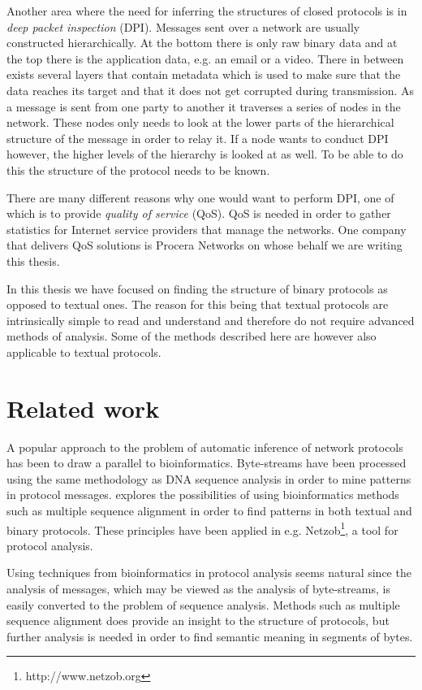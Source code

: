 \documentclass[a4paper]{report}
\begin{document}
Another area where the need for inferring the structures of closed protocols is
in \emph{deep packet inspection} (DPI). Messages sent over a network are
usually constructed hierarchically. At the bottom there is only raw binary data
and at the top there is the application data, e.g. an email or a video. There
in between exists several layers that contain metadata which is used to make
sure that the data reaches its target and that it does not get corrupted during
transmission. As a message is sent from one party to another it traverses a
series of nodes in the network. These nodes only needs to look at the lower
parts of the hierarchical structure of the message in order to relay it. If a
node wants to conduct DPI however, the higher levels of the hierarchy is looked
at as well. To be able to do this the structure of the protocol needs to be
known.

There are many different reasons why one would want to perform DPI, one of
which is to provide \emph{quality of service} (QoS). QoS is needed in order to
gather statistics for Internet service providers that manage the networks. One
company that delivers QoS solutions is Procera Networks on whose behalf we are
writing this thesis.

In this thesis we have focused on finding the structure of binary protocols as
opposed to textual ones. The reason for this being that textual protocols are
intrinsically simple to read and understand and therefore do not require
advanced methods of analysis. Some of the methods described here are however
also applicable to textual protocols.

\section{Related work}
A popular approach to the problem of automatic inference of network protocols
has been to draw a parallel to bioinformatics. Byte-streams have been
processed using the same methodology as DNA sequence analysis in order
to mine patterns in protocol messages. \citep{beddoe05} explores the
possibilities of using bioinformatics methods such as multiple sequence
alignment in order to find patterns in both textual and binary protocols. These
principles have been applied in e.g. Netzob\footnote{http://www.netzob.org}, a
tool for protocol analysis.

Using techniques from bioinformatics in protocol analysis seems natural since
the analysis of messages, which may be viewed as the analysis of byte-streams,
is easily converted to the problem of sequence analysis. Methods such as
multiple sequence alignment does provide an insight to the structure of
protocols, but further analysis is needed in order to find semantic meaning in
segments of bytes.
\end{document}
